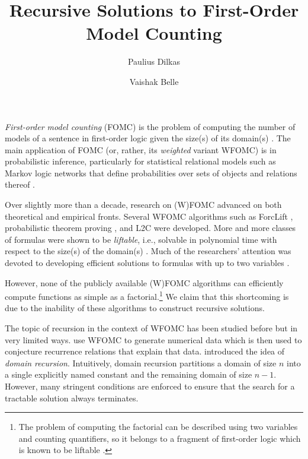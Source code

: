 \documentclass{article}
\title{Recursive Solutions to First-Order Model Counting}
\author{Paulius Dilkas}
\author{Vaishak Belle}
\affil{University of Edinburgh, Edinburgh, UK}
\begin{document}
\maketitle


\emph{First-order model counting} (FOMC) is the problem of computing the number of models of a sentence in first-order logic given the size(s) of its domain(s) \citep{DBLP:conf/ijcai/BroeckTMDR11}. The main application of FOMC (or, rather, its \emph{weighted} variant WFOMC) is in probabilistic inference, particularly for statistical relational models such as Markov logic networks that define probabilities over sets of objects and relations thereof \citep{DBLP:conf/ijcai/BroeckTMDR11,DBLP:journals/cacm/GogateD16}.

Over slightly more than a decade, research on (W)FOMC advanced on both theoretical and empirical fronts. Several WFOMC algorithms such as ForcLift \citep{DBLP:conf/ijcai/BroeckTMDR11}, probabilistic theorem proving \citep{DBLP:journals/cacm/GogateD16}, and L2C \citep{DBLP:conf/kr/KazemiP16} were developed. More and more classes of formulas were shown to be \emph{liftable}, i.e., solvable in polynomial time with respect to the size(s) of the domain(s) \citep{DBLP:conf/kr/BremenK21,DBLP:conf/nips/KazemiKBP16,DBLP:conf/lics/KuusistoL18,DBLP:journals/jair/Kuzelka21}. Much of the researchers' attention was devoted to developing efficient solutions to formulas with up to two variables \citep{DBLP:conf/uai/BremenK21,DBLP:journals/corr/abs-2110-05992}.


However, none of the publicly available (W)FOMC algorithms can efficiently compute functions as simple as a factorial.\footnote{The problem of computing the factorial can be described using two variables and counting quantifiers, so it belongs to a fragment of first-order logic which is known to be liftable \citep{DBLP:journals/jair/Kuzelka21}.} We claim that this shortcoming is due to the inability of these algorithms to construct recursive solutions.


The topic of recursion in the context of WFOMC has been studied before but in very limited ways.  use WFOMC to generate numerical data which is then used to conjecture recurrence relations that explain that data.  introduced the idea of \emph{domain recursion}. Intuitively, domain recursion partitions a domain of size $n$ into a single explicitly named constant and the remaining domain of size $n-1$. However, many stringent conditions are enforced to ensure that the search for a tractable solution always terminates.
\end{document}
